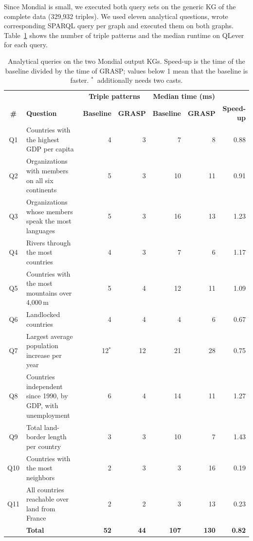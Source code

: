 Since Mondial is small, we executed both query sets on the generic KG of the complete data (329{,}932 triples). We used eleven analytical questions, wrote corresponding SPARQL query per graph and executed them on both graphs. Table~\ref{tab:mondial-queries} shows the number of triple patterns and the median runtime on QLever for each query.

\begin{table}[!htbp]
  \centering
  \small
  \renewcommand{\arraystretch}{1.3}
  \setlength{\tabcolsep}{4pt}
  \begin{tabular}{c >{\raggedright\arraybackslash}p{5.6cm} r r r r r}
    \hline
    & & \multicolumn{2}{c}{\textbf{Triple patterns}} & \multicolumn{2}{c}{\textbf{Median time (ms)}} & \\
    \textbf{\#} & \textbf{Question} & \textbf{Baseline} & \textbf{GRASP} & \textbf{Baseline} & \textbf{GRASP} & \textbf{Speed-up} \\
    \hline
    Q1  & Countries with the highest GDP per capita                  & 4  & 3  & 7  & 8  & 0.88 \\
    Q2  & Organizations with members on all six continents           & 5  & 3  & 10 & 11 & 0.91 \\
    Q3  & Organizations whose members speak the most languages       & 5  & 3  & 16 & 13 & 1.23 \\
    Q4  & Rivers through the most countries                          & 4  & 3  & 7  & 6  & 1.17 \\
    Q5  & Countries with the most mountains over 4{,}000\,m          & 5  & 4  & 12 & 11 & 1.09 \\
    Q6  & Landlocked countries                                       & 4  & 4  & 4  & 6  & 0.67 \\
    Q7  & Largest average population increase per year               & 12\(^{*}\) & 12 & 21 & 28 & 0.75 \\
    Q8  & Countries independent since 1990, by GDP, with unemployment & 6 & 4  & 14 & 11 & 1.27 \\
    Q9  & Total land-border length per country                       & 3  & 3  & 10 & 7  & 1.43 \\
    Q10 & Countries with the most neighbors                          & 2  & 3  & 3  & 16 & 0.19 \\
    Q11 & All countries reachable over land from France              & 2  & 2  & 3  & 13 & 0.23 \\
    \hline
        & \textbf{Total}                                              & \textbf{52} & \textbf{44} & \textbf{107} & \textbf{130} & \textbf{0.82} \\
    \hline
  \end{tabular}
  \caption[Analytical queries on the Mondial output KGs]{Analytical queries on the two Mondial output KGs. Speed-up is the time of the baseline divided by the time of GRASP; values below 1 mean that the baseline is faster. \(^{*}\)~additionally needs two casts.}
  \label{tab:mondial-queries}
\end{table}

